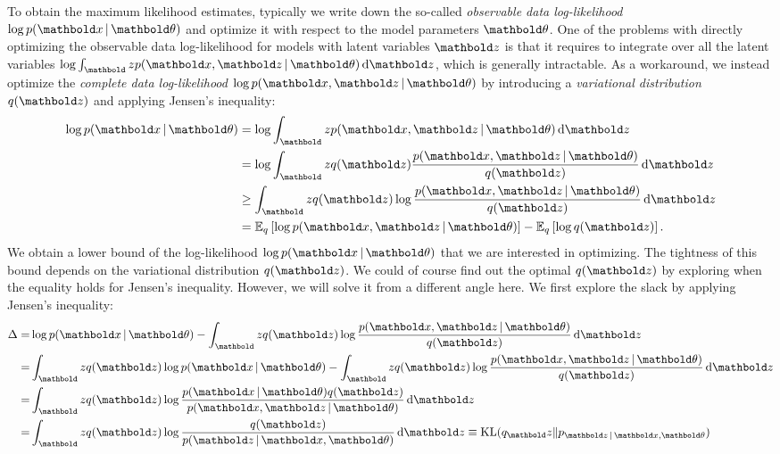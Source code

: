 To obtain the maximum likelihood estimates, typically we write down the so-called \textit{observable data log-likelihood} $\log p(\mbx \g \mb\theta)$ and optimize it with respect to the model parameters $\mb\theta$. One of the problems with directly optimizing the observable data log-likelihood for models with latent variables $\mbz$ is that it requires to integrate over all the latent variables $\log \int_\mbz p(\mbx, \mbz \g \mb\theta) \dif\mbz$, which is generally intractable. As a workaround, we instead optimize the \textit{complete data log-likelihood} $\log p(\mbx, \mbz \g \mb \theta)$ by introducing a \textit{variational distribution} $q(\mbz)$ and applying Jensen's inequality:
\begin{equation}
\begin{split}
\log p(\mbx \g \mb\theta) &= \log\int_\mbz p(\mbx, \mbz \g \mb\theta) \dif{\mbz}\\
&= \log\int_\mbz q(\mbz) \frac{p(\mbx, \mbz \g \mb\theta)}{q(\mbz)} \dif{\mbz}\\
&\geq \int_\mbz q(\mbz) \log\frac{p(\mbx, \mbz \g \mb\theta)}{q(\mbz)} \dif\mbz\\
&= \EE{q}{\log p(\mbx, \mbz \g \mb\theta)} - \EE{q}{\log q(\mbz)}.
\end{split}
\label{chpt:background:eq:em}
\end{equation}
We obtain a lower bound of the log-likelihood $\log p(\mbx \g \mb\theta)$ that we are interested in optimizing. The tightness of this bound depends on the variational distribution $q(\mbz)$. We could of course find out the optimal $q(\mbz)$ by exploring when the equality holds for Jensen's inequality. However, we will solve it from a different angle here. We first explore the slack by applying Jensen's inequality:
\begin{equation}
\begin{split}
\Delta =& \log p(\mbx \g \mb\theta) - \int_\mbz q(\mbz) \log\frac{p(\mbx, \mbz \g \mb\theta)}{q(\mbz)} \dif\mbz \\
=& \int_\mbz q(\mbz)\log p(\mbx \g \mb\theta) - \int_\mbz q(\mbz) \log\frac{p(\mbx, \mbz \g \mb\theta)}{q(\mbz)} \dif\mbz\\
=& \int_\mbz q(\mbz) \log\frac{p(\mbx \g \mb\theta) q(\mbz)} {p(\mbx, \mbz \g \mb\theta)}\dif\mbz\\
=& \int_\mbz q(\mbz) \log\frac{ q(\mbz)} {p(\mbz \g \mbx, \mb\theta)}\dif\mbz \equiv \textrm{KL}(q_\mbz\|p_{\mbz \g \mbx, \mb\theta})
\end{split}
\label{chpt:background:eq:em_kl}
\end{equation}

